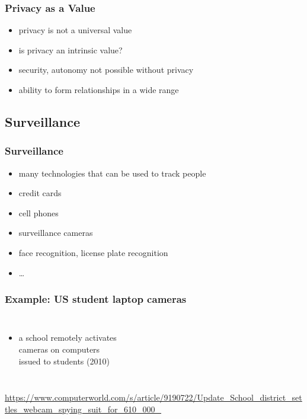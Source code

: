 \documentclass[dvipsnames]{beamer}
\theoremstyle{plain}
\begin{document}
\begin{frame}
  \frametitle{Privacy as a Value}

  \begin{itemize}
    \item privacy is not a universal value

    \pause
    \bigskip
    \item is privacy an intrinsic value?
    \smallskip
    \item security, autonomy not possible without privacy
    \item ability to form relationships in a wide range
  \end{itemize}
\end{frame}

\subsection{Surveillance}

\begin{frame}
  \frametitle{Surveillance}

  \begin{itemize}
    \item many technologies that can be used to track people

    \medskip
    \item credit cards
    \item cell phones
    \item surveillance cameras
    \item face recognition, license plate recognition
    \item \ldots
  \end{itemize}
\end{frame}

\begin{frame}
  \frametitle{Example: US student laptop cameras}

  \begin{columns}

    \begin{itemize}
      \item a school remotely activates\\
        cameras on computers\\
        issued to students (2010)
    \end{itemize}
  \end{columns}

  \medskip
  \tiny{\url{https://www.computerworld.com/s/article/9190722/Update_School_district_settles_webcam_spying_suit_for_610_000_}}\\
\end{frame}
\end{document}
